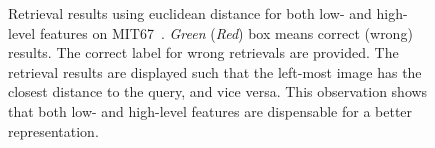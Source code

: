 \documentclass[10pt,twocolumn,letterpaper]{article}
\begin{document}
\begin{figure}[htbp]
\centering

\caption{Retrieval results using euclidean distance for both low- and high-level features on MIT67~\cite{MIT67}. \textit{Green} (\textit{Red}) box means correct (wrong) results. The correct label for wrong retrievals are provided. The retrieval results are displayed such that the left-most image has the closest distance to the query, and vice versa. This observation shows that both low- and high-level features are dispensable for a better representation.}

\label{fig:moti}
\end{figure}


\end{document}
